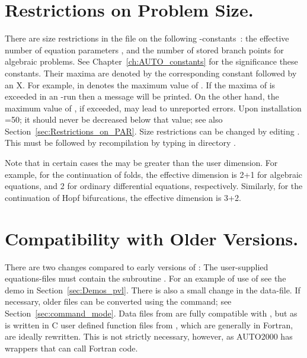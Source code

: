 \section{ Restrictions on Problem Size.} \label{sec:Restrictions}
There are size restrictions in the file 
on the following \AUTO-constants~:
the effective number of equation parameters ,
and the number of stored branch points  for algebraic problems.
See Chapter~\ref{ch:AUTO_constants} 
for the significance these constants. 
Their maxima are denoted by the  corresponding constant followed by an X.
For example,  in  denotes the maximum value 
of .
If the maxima of  is exceeded in an \AUTO-run then a message 
will be printed.
On the other hand, the maximum value of , 
if exceeded, may lead to unreported errors.
Upon installation =50; it should never be decreased below that value;
see also Section~\ref{sec:Restrictions_on_PAR}.
Size restrictions can be changed by editing .
This must be followed by recompilation by typing  
in directory .

Note that in certain cases the  may be greater
than the user dimension.
For example, for the continuation of folds,
the effective dimension is 2+1 for algebraic equations,
and 2 for ordinary differential equations, respectively.
Similarly, for the continuation of Hopf bifurcations,
the effective dimension is 3+2.
 
 
\section{Compatibility with Older Versions.} \label{sec:Compatibility}
There are two changes compared to early versions of \AUTOolder:
The user-supplied equations-files must contain the subroutine .
For an example of use of  see the demo  
in Section~\ref{sec:Demos_pvl}.
There is also a small change in the  data-file.
If necessary, older \AUTOolder files can be converted using the 
 command; see Section~\ref{sec:command_mode}.
Data files from \AUTOold are fully compatible
with \AUTOc, but as \AUTOc is written in {\cal C}
user defined function files from \AUTOold, which
are generally in {\cal Fortran}, are ideally rewritten.
This is not strictly necessary, however, as AUTO2000 has wrappers that
can call {\cal Fortran} code.

